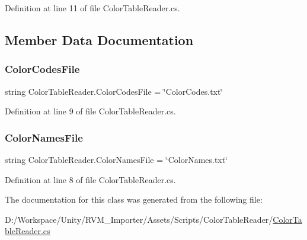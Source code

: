 Definition at line 11 of file Color\+Table\+Reader.\+cs.



\subsection{Member Data Documentation}
\mbox{\label{class_color_table_reader_ab8722a8a147e2cef30b8334a5f5797a5}} 
\subsubsection{\texorpdfstring{ColorCodesFile}{ColorCodesFile}}
{\footnotesize\ttfamily string Color\+Table\+Reader.\+Color\+Codes\+File = \char`\"{}Color\+Codes.\+txt\char`\"{}\hspace{0.3cm}{\ttfamily [static]}}



Definition at line 9 of file Color\+Table\+Reader.\+cs.

\mbox{\label{class_color_table_reader_a1b5e976c34598413c6c0dbc371ce9483}} 
\subsubsection{\texorpdfstring{ColorNamesFile}{ColorNamesFile}}
{\footnotesize\ttfamily string Color\+Table\+Reader.\+Color\+Names\+File = \char`\"{}Color\+Names.\+txt\char`\"{}\hspace{0.3cm}{\ttfamily [static]}}



Definition at line 8 of file Color\+Table\+Reader.\+cs.



The documentation for this class was generated from the following file\+:\begin{DoxyCompactItemize}
\item 
D\+:/\+Workspace/\+Unity/\+R\+V\+M\+\_\+\+Importer/\+Assets/\+Scripts/\+Color\+Table\+Reader/\mbox{\hyperlink{_color_table_reader_8cs}{Color\+Table\+Reader.\+cs}}\end{DoxyCompactItemize}
